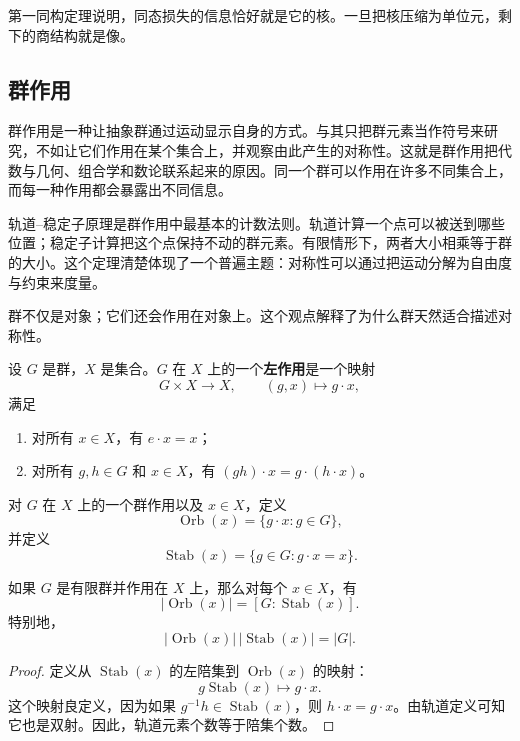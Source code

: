 \begin{remark}
第一同构定理说明，同态损失的信息恰好就是它的核。一旦把核压缩为单位元，剩下的商结构就是像。
\end{remark}

\subsection{群作用}


群作用是一种让抽象群通过运动显示自身的方式。与其只把群元素当作符号来研究，不如让它们作用在某个集合上，并观察由此产生的对称性。这就是群作用把代数与几何、组合学和数论联系起来的原因。同一个群可以作用在许多不同集合上，而每一种作用都会暴露出不同信息。

轨道--稳定子原理是群作用中最基本的计数法则。轨道计算一个点可以被送到哪些位置；稳定子计算把这个点保持不动的群元素。有限情形下，两者大小相乘等于群的大小。这个定理清楚体现了一个普遍主题：对称性可以通过把运动分解为自由度与约束来度量。

群不仅是对象；它们还会作用在对象上。这个观点解释了为什么群天然适合描述对称性。

\begin{definition}[群作用]
设 $G$ 是群，$X$ 是集合。$G$ 在 $X$ 上的一个\textbf{左作用}是一个映射
\[
    G\times X\to X,\qquad (g,x)\mapsto g\cdot x,
\]
满足
\begin{enumerate}
    \item 对所有 $x\in X$，有 $e\cdot x=x$；
    \item 对所有 $g,h\in G$ 和 $x\in X$，有 $(gh)\cdot x=g\cdot(h\cdot x)$。
\end{enumerate}
\end{definition}

\begin{definition}[轨道与稳定子]
对 $G$ 在 $X$ 上的一个群作用以及 $x\in X$，定义
\[
    \operatorname{Orb}(x)=\{g\cdot x:g\in G\},
\]
并定义
\[
    \operatorname{Stab}(x)=\{g\in G:g\cdot x=x\}.
\]
\end{definition}

\begin{theorem}[轨道--稳定子定理]
如果 $G$ 是有限群并作用在 $X$ 上，那么对每个 $x\in X$，有
\[
    |\operatorname{Orb}(x)|=[G:\operatorname{Stab}(x)].
\]
特别地，
\[
    |\operatorname{Orb}(x)|\,|\operatorname{Stab}(x)|=|G|.
\]
\end{theorem}

\begin{proof}
定义从 $\operatorname{Stab}(x)$ 的左陪集到 $\operatorname{Orb}(x)$ 的映射：
\[
    g\operatorname{Stab}(x)\mapsto g\cdot x.
\]
这个映射良定义，因为如果 $g^{-1}h\in\operatorname{Stab}(x)$，则 $h\cdot x=g\cdot x$。由轨道定义可知它也是双射。因此，轨道元素个数等于陪集个数。
\end{proof}

